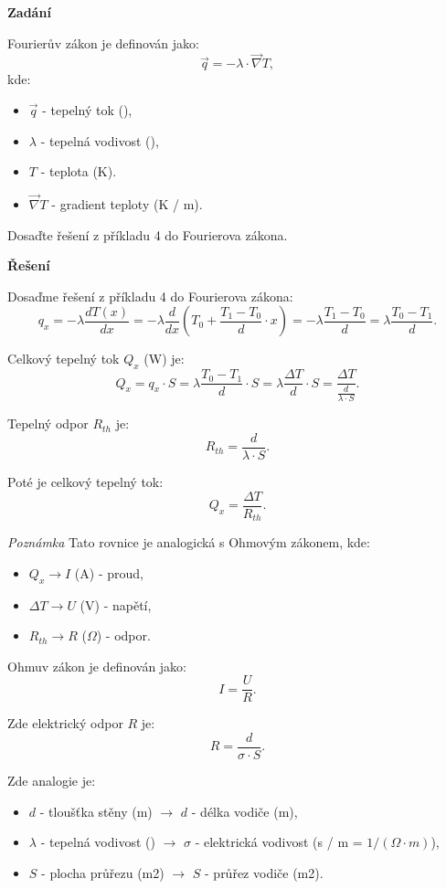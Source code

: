 \documentclass{article}
\begin{document}
\textbf{Zadání}

Fourierův zákon je definován jako:
\begin{equation}
    \vec{q} = - \lambda \cdot \vec{\nabla} T,
\end{equation}
kde:
\begin{itemize}
    \item $\vec{q}$ - tepelný tok (\ueqWperMsq),
    \item $\lambda$ - tepelná vodivost (\ueqWperMsqperK),
    \item $T$ - teplota (K).
    \item $\vec{\nabla} T$ - gradient teploty (K / m).
\end{itemize}

Dosaďte řešení z příkladu 4 do Fourierova zákona.

\textbf{Řešení}

Dosaďme řešení z příkladu 4 do Fourierova zákona:
$$
    q_x = - \lambda  \frac{dT(x)}{dx} = - \lambda  \frac{d}{dx} \left( T_0 + \frac{T_1 - T_0}{d} \cdot x \right) = - \lambda  \frac{T_1 - T_0}{d} = \lambda  \frac{T_0 - T_1}{d}.
$$

Celkový tepelný tok $Q_x$ (W) je:
$$
    Q_x = q_x \cdot S = \lambda \frac{T_0 - T_1}{d} \cdot S = \lambda \frac{\Delta T}{d} \cdot S = \frac{\Delta T}{\frac{d}{\lambda \cdot S}}.
$$

Tepelný odpor $R_{th}$ je:
$$
    R_{th} = \frac{d}{\lambda \cdot S}.
$$

Poté je celkový tepelný tok:
$$
    Q_x = \frac{\Delta T}{R_{th}}.
$$

\textit{Poznámka}
Tato rovnice je analogická s Ohmovým zákonem, kde:
\begin{itemize}
    \item $Q_x \rightarrow I$ (A) - proud,
    \item $\Delta T \rightarrow U$ (V) - napětí,
    \item $R_{th} \rightarrow R$ ($\Omega$) - odpor.
\end{itemize}

Ohmuv zákon je definován jako:
$$
    I = \frac{U}{R}.
$$

Zde elektrický odpor $R$ je:
$$
    R = \frac{d}{\sigma \cdot S}.
$$

Zde analogie je:
\begin{itemize}
    \item $d$ - tloušťka stěny (m) $\rightarrow$ $d$ - délka vodiče (m),
    \item $\lambda$ - tepelná vodivost (\ueqWperMsqperK) $\rightarrow$ $\sigma$ - elektrická vodivost (s / m = $1 / (\Omega \cdot m)$),
    \item $S$ - plocha průřezu (m2) $\rightarrow$ $S$ - průřez vodiče (m2).
\end{itemize}
\end{document}
